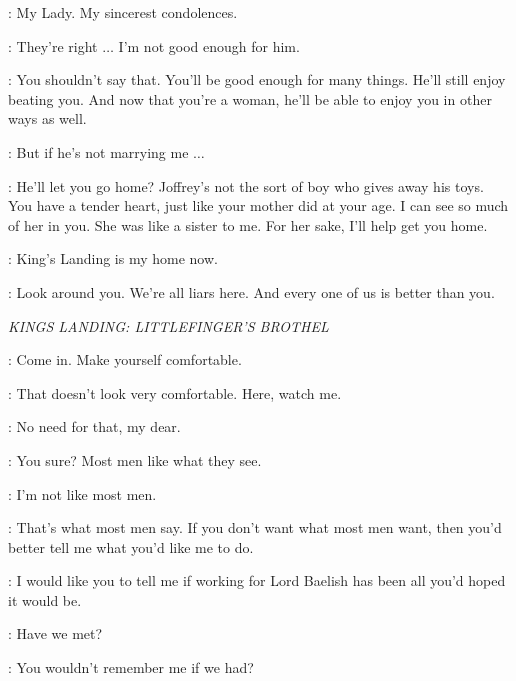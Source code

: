 \LITTLEFINGER: My Lady. My sincerest condolences. 

\SANSA: They're right $\ldots$ I'm not good enough for him. 

\LITTLEFINGER: You shouldn't say that. You'll be good enough for many things. He'll still enjoy beating you. And now that you're a woman, he'll be able to enjoy you in other ways as well. 

\SANSA: But if he's not marrying me $\ldots$  

\LITTLEFINGER: He'll let you go home? Joffrey's not the sort of boy who gives away his toys. You have a tender heart, just like your mother did at your age. I can see so much of her in you. She was like a sister to me. For her sake, I'll help get you home. 

\SANSA: King's Landing is my home now. 

\LITTLEFINGER: Look around you. We're all liars here. And every one of us is better than you. 


\scene

\textit{KINGS LANDING: LITTLEFINGER'S BROTHEL} 


\ROS: Come in. Make yourself comfortable. 


\ROS: That doesn't look very comfortable. Here, watch me. 


\VARYS: No need for that, my dear. 

\ROS: You sure? Most men like what they see. 

\VARYS: I'm not like most men. 

\ROS: That's what most men say.  If you don't want what most men want, then you'd better tell me what you'd like me to do. 

\VARYS: I would like you to tell me if working for Lord Baelish has been all you'd hoped it would be. 

\ROS: Have we met? 

\VARYS: You wouldn't remember me if we had? 

